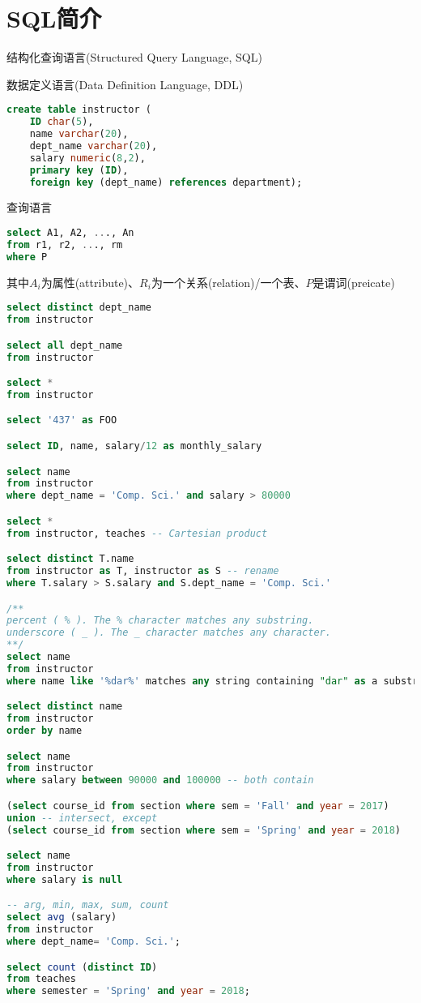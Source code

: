 
\section{SQL简介}
结构化查询语言(Structured Query Language, SQL)

数据定义语言(Data Definition Language, DDL)
\begin{lstlisting}[language=sql]
create table instructor (
	ID char(5),
	name varchar(20),
	dept_name varchar(20),
	salary numeric(8,2),
	primary key (ID),
	foreign key (dept_name) references department);
\end{lstlisting}

查询语言
\begin{lstlisting}[language=sql]
select A1, A2, ..., An
from r1, r2, ..., rm
where P
\end{lstlisting}
其中$A_i$为属性(attribute)、$R_i$为一个关系(relation)/一个表、$P$是谓词(preicate)

\begin{lstlisting}[language=sql]
select distinct dept_name
from instructor

select all dept_name
from instructor

select *
from instructor

select '437' as FOO

select ID, name, salary/12 as monthly_salary

select name
from instructor
where dept_name = 'Comp. Sci.' and salary > 80000

select *
from instructor, teaches -- Cartesian product

select distinct T.name
from instructor as T, instructor as S -- rename
where T.salary > S.salary and S.dept_name = 'Comp. Sci.'

/**
percent ( % ). The % character matches any substring.
underscore ( _ ). The _ character matches any character.
**/
select name
from instructor
where name like '%dar%' matches any string containing "dar" as a substring

select distinct name
from instructor
order by name

select name
from instructor
where salary between 90000 and 100000 -- both contain

(select course_id from section where sem = 'Fall' and year = 2017)
union -- intersect, except
(select course_id from section where sem = 'Spring' and year = 2018)

select name
from instructor
where salary is null

-- arg, min, max, sum, count
select avg (salary)
from instructor
where dept_name= 'Comp. Sci.';

select count (distinct ID)
from teaches
where semester = 'Spring' and year = 2018;
\end{lstlisting}


